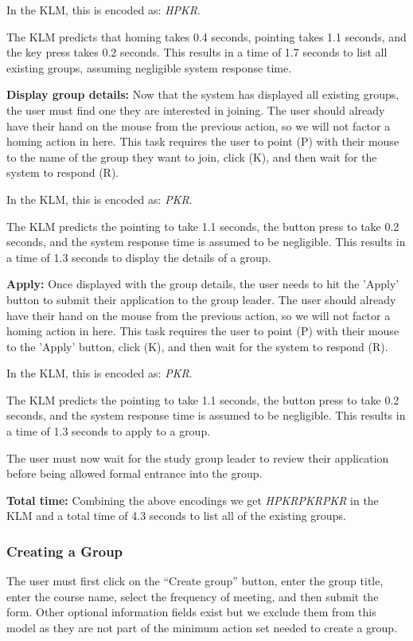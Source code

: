 \documentclass[conference]{IEEEtran}
\begin{document}
In the KLM, this is encoded as: \emph{HPKR}.

The KLM predicts that homing takes 0.4 seconds, pointing takes 1.1 seconds, and the key press takes 0.2 seconds.
This results in a time of 1.7 seconds to list all existing groups, assuming negligible system response time.

\textbf{Display group details:}
Now that the system has displayed all existing groups, the user must find one they are interested in joining.
The user should already have their hand on the mouse from the previous action, so we will not factor a homing action in here.
This task requires the user to point (P) with their mouse to the name of the group they want to join, click (K), and then wait for the system to respond (R).

In the KLM, this is encoded as: \emph{PKR}.

The KLM predicts the pointing to take 1.1 seconds, the button press to take 0.2 seconds, and the system response time is assumed to be negligible.
This results in a time of 1.3 seconds to display the details of a group.

\textbf{Apply:}
Once displayed with the group details, the user needs to hit the 'Apply' button to submit their application to the group leader.
The user should already have their hand on the mouse from the previous action, so we will not factor a homing action in here.
This task requires the user to point (P) with their mouse to the 'Apply' button, click (K), and then wait for the system to respond (R).

In the KLM, this is encoded as: \emph{PKR}.

The KLM predicts the pointing to take 1.1 seconds, the button press to take 0.2 seconds, and the system response time is assumed to be negligible.
This results in a time of 1.3 seconds to apply to a group.

The user must now wait for the study group leader to review their application before being allowed formal entrance into the group.

\textbf{Total time:}
Combining the above encodings we get \emph{HPKRPKRPKR} in the KLM and a total time of 4.3 seconds to list all of the existing groups.


\subsubsection{Creating a Group}
The user must first click on the ``Create group'' button, enter the group title, enter the course name, select the frequency of meeting, and then submit the form.
Other optional information fields exist but we exclude them from this model as they are not part of the minimum action set needed to create a group.
\end{document}
